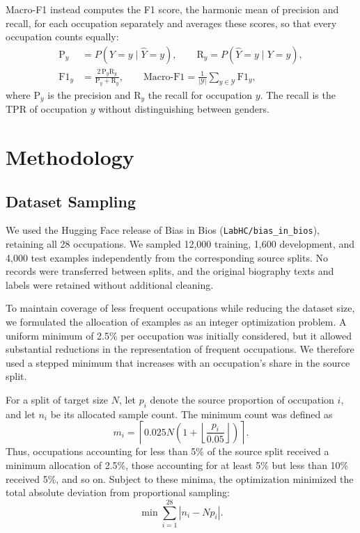 \documentclass[sigconf]{acmart}
\begin{document}
Macro-F1 instead computes the F1 score, the harmonic mean of precision and recall, for each occupation separately and averages these scores, so that every occupation counts equally:
\begin{align}
  \mathrm{P}_y &= P(Y = y \mid \hat{Y} = y), \qquad
  \mathrm{R}_y = P(\hat{Y} = y \mid Y = y), \\
  \mathrm{F1}_y &= \frac{2\,\mathrm{P}_y \mathrm{R}_y}{\mathrm{P}_y + \mathrm{R}_y}, \qquad
  \text{Macro-F1} = \frac{1}{|\mathcal{Y}|}\sum_{y \in \mathcal{Y}} \mathrm{F1}_y,
\end{align}
where $\mathrm{P}_y$ is the precision and $\mathrm{R}_y$ the recall for occupation $y$.
The recall is the TPR of occupation $y$ without distinguishing between genders.

\section{Methodology}
\subsection{Dataset Sampling}

We used the Hugging Face release of Bias in Bios (\texttt{LabHC/bias\_in\_bios}), retaining all 28 occupations. We sampled 12,000 training, 1,600 development, and 4,000 test examples independently from the corresponding source splits. No records were transferred between splits, and the original biography texts and labels were retained without additional cleaning.

To maintain coverage of less frequent occupations while reducing the dataset size, we formulated the allocation of examples as an integer optimization problem. A uniform minimum of 2.5\% per occupation was initially considered, but it allowed substantial reductions in the representation of frequent occupations. We therefore used a stepped minimum that increases with an occupation's share in the source split.

For a split of target size $N$, let $p_i$ denote the source proportion of occupation $i$, and let $n_i$ be its allocated sample count. The minimum count was defined as
\begin{equation}
    m_i = \left\lceil 0.025N
    \left(1 + \left\lfloor \frac{p_i}{0.05} \right\rfloor\right)
    \right\rceil.
\end{equation}
Thus, occupations accounting for less than 5\% of the source split received a minimum allocation of 2.5\%, those accounting for at least 5\% but less than 10\% received 5\%, and so on. Subject to these minima, the optimization minimized the total absolute deviation from proportional sampling:
\begin{equation}
    \min \sum_{i=1}^{28} \left|n_i - Np_i\right|.
\end{equation}
\end{document}
